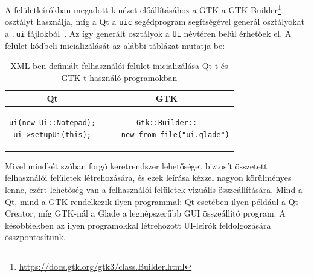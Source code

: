 A felületleírókban megadott kinézet előállításához a GTK a GTK Builder\footnote{\url{https://docs.gtk.org/gtk3/class.Builder.html}} osztályt használja, míg a Qt a \texttt{uic} segédprogram segítségével generál osztályokat a \texttt{.ui} fájlokból~\cite{qtnotepadtutorial}. Az így generált osztályok a \texttt{Ui} névtéren belül érhetőek el. A felület kódbeli inicializálását az alábbi táblázat mutatja be:
\begin{table}[h]
	\centering
	\begin{tabular}{|c|c|}
		\hline
		Qt & GTK \\
		\hline
		\begin{minipage}{0.35\linewidth}
			\begin{lstlisting}
ui(new Ui::Notepad);
ui->setupUi(this);
			\end{lstlisting}
		\end{minipage}
		&
		\begin{minipage}{0.35\linewidth}
			\begin{lstlisting}
Gtk::Builder::
    new_from_file("ui.glade")
			\end{lstlisting}
		\end{minipage} \\
		\hline
	\end{tabular}
	\label{tab:qtgtkxmlbuild}
	\caption{XML-ben definiált felhasználói felület inicializálása Qt-t és GTK-t használó programokban}
\end{table}

Mivel mindkét szóban forgó keretrendszer lehetőséget biztosít összetett felhasználói felületek létrehozására, és ezek leírása kézzel nagyon körülményes lenne, ezért lehetőség van a felhasználói felületek vizuális összeállítására. Mind a Qt, mind a GTK rendelkezik ilyen programmal: Qt esetében ilyen például a Qt Creator, míg GTK-nál a Glade a legnépszerűbb GUI összeállító program. A későbbiekben az ilyen programokkal létrehozott UI-leírók feldolgozására összpontosítunk.

{
}

